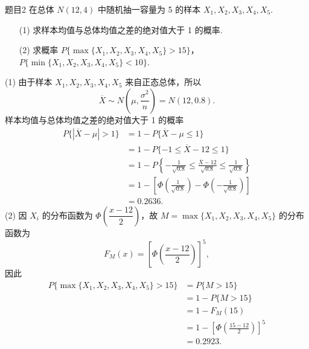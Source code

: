 \begin{question}{题目2}
    在总体 $N(12, 4)$ 中随机抽一容量为 5 的样本 $X_1, X_2, X_3, X_4, X_5$.
    \begin{enumerate}
        \item [(1)] 求样本均值与总体均值之差的绝对值大于 1 的概率.
        \item [(2)] 求概率 $P\{\max\{X_1, X_2, X_3, X_4, X_5\} > 15\}$，$P\{\min\{X_1, X_2, X_3, X_4, X_5\} < 10\}$.
    \end{enumerate}
\end{question}
\begin{solution}
    (1) 由于样本 $X_1, X_2, X_3, X_4, X_5$ 来自正态总体，所以
    $$
        \overline{X} \sim N\left(\mu, \frac{\sigma^2}{n}\right) = N\left(12, 0.8\right).
    $$
    样本均值与总体均值之差的绝对值大于 1 的概率
    $$
        \begin{aligned}
            P\{|\overline{X} - \mu| > 1\}
             & = 1 - P\{\overline{X} - \mu \leqslant 1 \}                                                                                 \\
             & = 1 - P\{-1 \leqslant \overline{X}-12 \leqslant 1\}                                                                        \\
             & = 1 - P\left\{ -\frac{1}{\sqrt{0.8}} \leqslant \frac{\overline{X} - 12}{\sqrt{0.8}} \leqslant \frac{1}{\sqrt{0.8}}\right\} \\
             & = 1 - \left[\Phi\left(\frac{1}{\sqrt{0.8}}\right) - \Phi\left(-\frac{1}{\sqrt{0.8}}\right)\right]                          \\
             & = 0.2636.
        \end{aligned}
    $$
    (2) 因 $X_i$ 的分布函数为 $\Phi\left(\dfrac{x-12}{2}\right)$，故 $M = \max\{X_1, X_2, X_3, X_4, X_5\}$ 的分布函数为
    $$
        F_M(x) = \left[\Phi\left(\frac{x-12}{2}\right)\right]^5,
    $$
    因此
    $$
        \begin{aligned}
            P\{\max\{X_1, X_2, X_3, X_4, X_5\} > 15\}
             & = P\{M > 15\}                                         \\
             & = 1 - P\{M>15\}                                       \\
             & = 1 - F_M(15)                                         \\
             & = 1 - \left[\Phi\left(\frac{15-12}{2}\right)\right]^5 \\
             & = 0.2923.
        \end{aligned}
$$
\end{solution}
